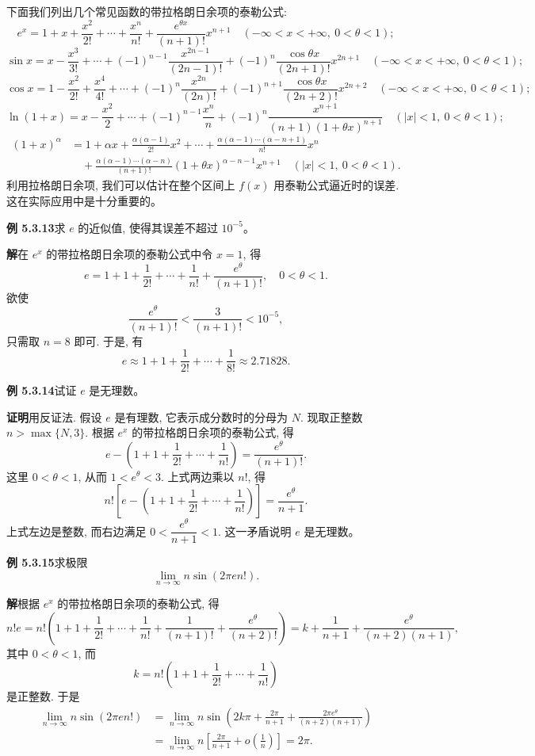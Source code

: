 \documentclass[UTF8, 12pt, fontset=fandol, oneside]{ctexart}
\begin{document}
下面我们列出几个常见函数的带拉格朗日余项的泰勒公式:
\[
  e^x=1+x+\frac{x^2}{2!}+\cdots+\frac{x^n}{n!}+\frac{e^{\theta x}}{(n+1)!}x^{n+1}
  \quad (-\infty<x<+\infty,\ 0<\theta<1);
\]
\[
  \sin x=x-\frac{x^3}{3!}+\cdots+(-1)^{n-1}\frac{x^{2n-1}}{(2n-1)!}
  +(-1)^n\frac{\cos\theta x}{(2n+1)!}x^{2n+1}
  \quad (-\infty<x<+\infty,\ 0<\theta<1);
\]
\[
  \cos x=1-\frac{x^2}{2!}+\frac{x^4}{4!}+\cdots+(-1)^n\frac{x^{2n}}{(2n)!}
  +(-1)^{n+1}\frac{\cos\theta x}{(2n+2)!}x^{2n+2}
  \quad (-\infty<x<+\infty,\ 0<\theta<1);
\]
\[
  \ln(1+x)=x-\frac{x^2}{2}+\cdots+(-1)^{n-1}\frac{x^n}{n}
  +(-1)^n\frac{x^{n+1}}{(n+1)(1+\theta x)^{n+1}}
  \quad (|x|<1,\ 0<\theta<1);
\]
\[
\begin{aligned}
  (1+x)^\alpha
  &=
  1+\alpha x+\frac{\alpha(\alpha-1)}{2!}x^2+\cdots
  +\frac{\alpha(\alpha-1)\cdots(\alpha-n+1)}{n!}x^n \\
  &\quad+
  \frac{\alpha(\alpha-1)\cdots(\alpha-n)}{(n+1)!}(1+\theta x)^{\alpha-n-1}x^{n+1}
  \quad (|x|<1,\ 0<\theta<1).
\end{aligned}
\]
利用拉格朗日余项, 我们可以估计在整个区间上 $f(x)$ 用泰勒公式逼近时的误差. 这在实际应用中是十分重要的。

\noindent\textbf{例 5.3.13}\quad 求 $e$ 的近似值, 使得其误差不超过 $10^{-5}$。

\noindent\textbf{解}\quad 在 $e^x$ 的带拉格朗日余项的泰勒公式中令 $x=1$, 得
\[
  e=1+1+\frac1{2!}+\cdots+\frac1{n!}+\frac{e^\theta}{(n+1)!},\quad 0<\theta<1.
\]
欲使
\[
  \frac{e^\theta}{(n+1)!}<\frac3{(n+1)!}<10^{-5},
\]
只需取 $n=8$ 即可. 于是, 有
\[
  e\approx1+1+\frac1{2!}+\cdots+\frac1{8!}\approx2.71828.
\]

\noindent\textbf{例 5.3.14}\quad 试证 $e$ 是无理数。

\noindent\textbf{证明}\quad 用反证法. 假设 $e$ 是有理数, 它表示成分数时的分母为 $N$. 现取正整数 $n>\max\{N,3\}$. 根据 $e^x$ 的带拉格朗日余项的泰勒公式, 得
\[
  e-\left(1+1+\frac1{2!}+\cdots+\frac1{n!}\right)=\frac{e^\theta}{(n+1)!}.
\]
这里 $0<\theta<1$, 从而 $1<e^\theta<3$. 上式两边乘以 $n!$, 得
\[
  n!\left[e-\left(1+1+\frac1{2!}+\cdots+\frac1{n!}\right)\right]
  =
  \frac{e^\theta}{n+1}.
\]
上式左边是整数, 而右边满足 $0<\dfrac{e^\theta}{n+1}<1$. 这一矛盾说明 $e$ 是无理数。

\noindent\textbf{例 5.3.15}\quad 求极限
\[
  \lim_{n\to\infty}n\sin(2\pi en!).
\]

\noindent\textbf{解}\quad 根据 $e^x$ 的带拉格朗日余项的泰勒公式, 得
\[
  n!e
  =
  n!\left(1+1+\frac1{2!}+\cdots+\frac1{n!}+\frac1{(n+1)!}+\frac{e^\theta}{(n+2)!}\right)
  =
  k+\frac1{n+1}+\frac{e^\theta}{(n+2)(n+1)},
\]
其中 $0<\theta<1$, 而
\[
  k=n!\left(1+1+\frac1{2!}+\cdots+\frac1{n!}\right)
\]
是正整数. 于是
\[
\begin{aligned}
  \lim_{n\to\infty}n\sin(2\pi en!)
  &=
  \lim_{n\to\infty}
  n\sin\left(2k\pi+\frac{2\pi}{n+1}
  +\frac{2\pi e^\theta}{(n+2)(n+1)}\right) \\
  &=
  \lim_{n\to\infty}
  n\left[\frac{2\pi}{n+1}+o\left(\frac1n\right)\right]
  =
  2\pi.
\end{aligned}
\]
\end{document}
